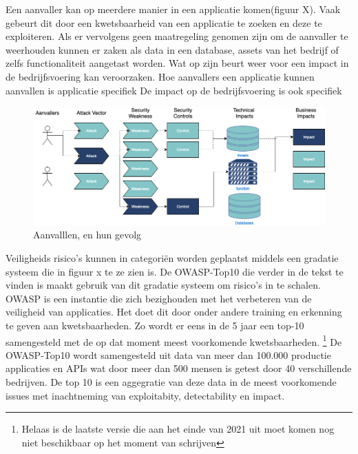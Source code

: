 Een aanvaller kan op meerdere manier in een applicatie komen(figuur X).
Vaak gebeurt dit door een kwetsbaarheid van een applicatie te zoeken en deze te exploiteren.
Als er vervolgens geen maatregeling genomen zijn om de aanvaller te weerhouden kunnen er zaken als data in een database, assets van het bedrijf of zelfs functionaliteit aangetast worden.
Wat op zijn beurt weer voor een impact in de bedrijfsvoering kan veroorzaken.
Hoe aanvallers een applicatie kunnen aanvallen is applicatie specifiek
De impact op de bedrijfsvoering is ook specifiek
\begin{figure}[H]
    \myfloatalign
    \includegraphics[width=15cm]{gfx/application security routes}
    \caption{Aanvalllen, en hun gevolg}
    \label{fig:Application Security Routes}
\end{figure}

Veiligheids risico's kunnen in categoriën worden geplaatst middels een gradatie systeem die in figuur x te ze zien is.
De OWASP-Top10 die verder in de tekst te vinden is maakt gebruik van dit gradatie systeem om risico's in te schalen.
OWASP is een instantie die zich bezighouden met het verbeteren van de veiligheid van applicaties.
Het doet dit door onder andere training en erkenning te geven aan kwetsbaarheden.
Zo wordt er eens in de 5 jaar een top-10 samengesteld met de op dat moment meest voorkomende kwetsbaarheden.
\footnote{Helaas is de laatste versie die aan het einde van 2021 uit moet komen nog niet beschikbaar op het moment van schrijven}
De OWASP-Top10 wordt samengesteld uit data van meer dan 100.000 productie applicaties en APIs wat door meer dan 500 mensen is getest door 40 verschillende bedrijven.
De top 10 is een aggegratie van deze data in de meest voorkomende issues met inachtneming van exploitabity, detectability en impact.



